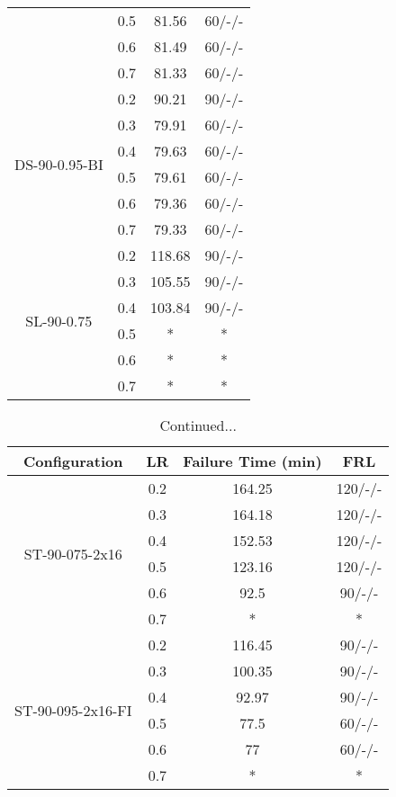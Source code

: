 \begin{table}[!htbp]
\begin{tabular}{cccc}
			& 0.5   & 81.56 & 60/-/- \\
			& 0.6   & 81.49 & 60/-/- \\
			& 0.7   & 81.33 & 60/-/- \\
	  \midrule
	  \multirow{6}[2]{*}{DS-90-0.95-BI} & 0.2   & 90.21 & 90/-/- \\
			& 0.3   & 79.91 & 60/-/- \\
			& 0.4   & 79.63 & 60/-/- \\
			& 0.5   & 79.61 & 60/-/- \\
			& 0.6   & 79.36 & 60/-/- \\
			& 0.7   & 79.33 & 60/-/- \\
	  \midrule
	  \multirow{6}[2]{*}{SL-90-0.75} & 0.2   & 118.68 & 90/-/- \\
			& 0.3   & 105.55 & 90/-/- \\
			& 0.4   & 103.84 & 90/-/- \\
			& 0.5   & *     & * \\
			& 0.6   & *     & * \\
			& 0.7   & *     & * \\
	  \bottomrule
	\end{tabular}%
  \label{tab:frl-parametric-experiment-a}%
\end{table}%
\begin{table}[htbp]
	\ContinuedFloat
	\centering
	\caption{Continued...}
	  \begin{tabular}{cccc}
	  \toprule
	  Configuration & LR    & Failure Time (min) & FRL \\
	  \midrule
	  \multirow{6}[2]{*}{ST-90-075-2x16} & 0.2   & 164.25 & 120/-/- \\
			& 0.3   & 164.18 & 120/-/- \\
			& 0.4   & 152.53 & 120/-/- \\
			& 0.5   & 123.16 & 120/-/- \\
			& 0.6   & 92.5  & 90/-/- \\
			& 0.7   & *     & * \\
	  \midrule
	  \multirow{6}[2]{*}{ST-90-095-2x16-FI} & 0.2   & 116.45 & 90/-/- \\
			& 0.3   & 100.35 & 90/-/- \\
			& 0.4   & 92.97 & 90/-/- \\
			& 0.5   & 77.5  & 60/-/- \\
			& 0.6   & 77    & 60/-/- \\
			& 0.7   & *     & * \\
	  \bottomrule
	  \end{tabular}%
	\label{tab:frl-parametric-experiment}%
  \end{table}%
  
